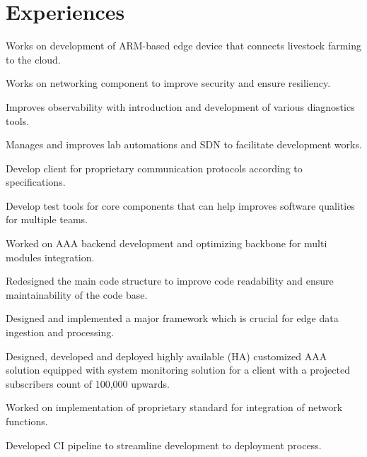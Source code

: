 \documentclass[letterpaper]{deedy-resume} %
\begin{document}
\begin{minipage}[t]{0.66\textwidth} %


\section{Experiences}

\vspace{\topsep}
\begin{tightitemize}
\item Works on development of ARM-based edge device that connects livestock farming to the cloud.
\item Works on networking component to improve security and ensure resiliency.
\item Improves observability with introduction and development of various diagnostics tools.
\item Manages and improves lab automations and SDN to facilitate development works.
\item Develop client for proprietary communication protocols according to specifications.
\item Develop test tools for core components that can help improves software qualities for multiple teams.
\end{tightitemize}
\sectionspace


\vspace{\topsep} %
\begin{tightitemize}
\item Worked on AAA backend development and optimizing backbone for multi modules integration.
\item Redesigned the main code structure to improve code readability and ensure maintainability of the code base.
\item Designed and implemented a major framework which is crucial for edge data ingestion and processing.
\item Designed, developed and deployed highly available (HA) customized AAA solution equipped with system monitoring solution for a client with a projected subscribers count of 100,000 upwards.
\item Worked on implementation of proprietary standard for integration of network functions.
\item Developed CI pipeline to streamline development to deployment process.
\end{tightitemize}


\end{minipage}
\end{document}

